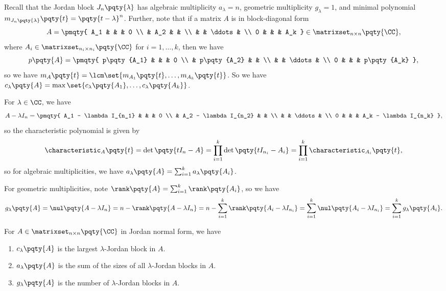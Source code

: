 Recall that the Jordan block \(J_n \pqty{\lambda}\) has algebraic multiplicity \(a_{\lambda} = n\), geometric multiplicity \(g_{\lambda} = 1\), and minimal polynomial \(m_{J_n \pqty{\lambda}} \pqty{t} = \pqty{t - \lambda}^n\). Further, note that if a matrix \(A\) is in block-diagonal form
\[
    A = \pmqty{
        A_1 & & & 0 \\
         & A_2 & & \\
         & & \ddots & \\
        0 & &  & A_k
    } \in \matrixset_{n \times n} \pqty{\CC},
\]
where \(A_i \in \matrixset_{n_i \times n_i} \pqty{\CC}\) for \(i = 1, \ldots, k\), then we have
\[
    p\pqty{A} = \pmqty{
        p\pqty{A_1} & & & 0 \\
         & p\pqty{A_2} & & \\
         & & \ddots & \\
        0 & &  & p\pqty{A_k}
    },
\]
so we have \(m_A\pqty{t} = \lcm\set{m_{A_1}\pqty{t}, \ldots, m_{A_k}\pqty{t}}\). So we have \(c_{\lambda}\pqty{A} = \max\set{c_{\lambda}\pqty{A_1}, \ldots, c_{\lambda}\pqty{A_k}}\).

For \(\lambda \in \CC\), we have
\[
    A - \lambda I_n = \pmqty{
        A_1 - \lambda I_{n_1} & & & 0 \\
         & A_2 - \lambda I_{n_2} & & \\
         & & \ddots & \\
        0 & &  & A_k - \lambda I_{n_k}
    },
\]
so the characteristic polynomial is given by
\[
    \characteristic_A\pqty{t} = \det\pqty{t I_n - A} = \prod_{i = 1}^{k} \det\pqty{t I_{n_i} - A_i} = \prod_{i = 1}^{k} \characteristic_{A_i}\pqty{t},
\]
so for algebraic multiplicities, we have \(a_{\lambda}\pqty{A} = \sum_{i = 1}^{k} a_{\lambda}\pqty{A_i}\).

For geometric multiplicities, note \(\rank\pqty{A} = \sum_{i = 1}^{k} \rank\pqty{A_i}\), so we have
\[
    g_\lambda \pqty{A} = \nul \pqty{A - \lambda I_n} = n - \rank\pqty{A - \lambda I_n} = n - \sum_{i = 1}^{k} \rank\pqty{A_i - \lambda I_{n_i}} = \sum_{i = 1}^{k} \nul\pqty{A_i - \lambda I_{n_i}} = \sum_{i = 1}^{k} g_\lambda \pqty{A_i}.
\]

\begin{proposition}
    For \(A \in \matrixset_{n \times n} \pqty{\CC}\) in Jordan normal form, we have
    \begin{enumerate}[label=(\roman*)]
        \item \(c_{\lambda} \pqty{A}\) is the largest \(\lambda\)-Jordan block in \(A\).
        \item \(a_{\lambda} \pqty{A}\) is the sum of the sizes of all \(\lambda\)-Jordan blocks in \(A\).
        \item \(g_{\lambda} \pqty{A}\) is the number of \(\lambda\)-Jordan blocks in \(A\).
    \end{enumerate}
\end{proposition}

